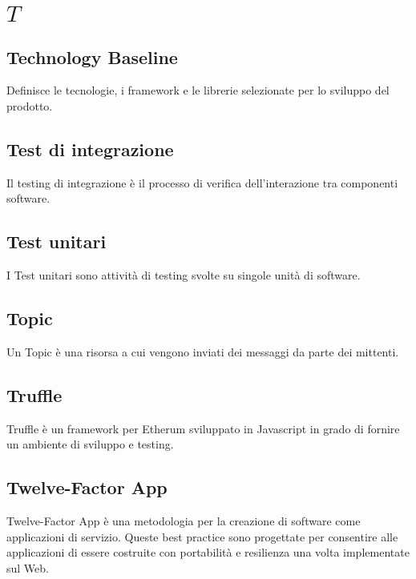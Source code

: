 \section{\quad$T\quad$}
\subsection{Technology Baseline}
Definisce le tecnologie, i framework e le librerie selezionate per lo sviluppo del prodotto.

\subsection{Test di integrazione}
Il testing di integrazione è il processo di verifica dell’interazione tra componenti software. 

\subsection{Test unitari}
I Test unitari sono attività di testing svolte su singole unità di software.

\subsection{Topic}
Un Topic è una risorsa a cui vengono inviati dei messaggi da parte dei mittenti.

\subsection{Truffle}
Truffle è un framework per Etherum sviluppato in Javascript in grado di fornire un ambiente di sviluppo e testing. 

\subsection{Twelve-Factor App}
Twelve-Factor App è una metodologia per la creazione di software come applicazioni di servizio. 
Queste best practice sono progettate per consentire alle applicazioni di essere costruite con portabilità e resilienza una volta implementate sul Web.

